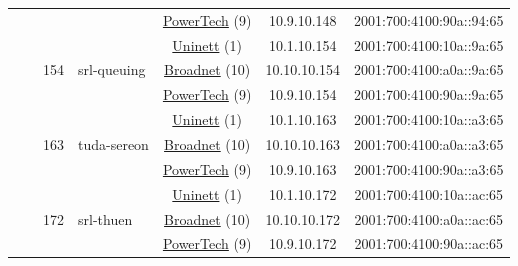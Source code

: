 \begin{small}
\begin{center}
\begin{longtable}{|c|c|c|c|c|c|c|c|}
  &  &  &  & \multicolumn{2}{|c|}{\tiny{\href{http://www.powertech.no}{PowerTech} (9)}} & \tiny{10.9.10.148} & \tiny{2001:700:4100:90a::94:65} \\* \cline{3-3}\cline{4-4}\cline{5-5}\cline{6-6}\cline{7-7}\cline{8-8}
  &  & \multirow{3}{*}{\tiny{154}} & \multicolumn{1}{|l|}{\multirow{3}{*}{\tiny{srl-queuing}}} & \multicolumn{2}{|c|}{\tiny{\href{https://www.uninett.no}{Uninett} (1)}} & \tiny{10.1.10.154} & \tiny{2001:700:4100:10a::9a:65} \\* \cline{5-5}\cline{6-6}\cline{7-7}\cline{8-8}
  &  &  &  & \multicolumn{2}{|c|}{\tiny{\href{https://www.broadnet.no}{Broadnet} (10)}} & \tiny{10.10.10.154} & \tiny{2001:700:4100:a0a::9a:65} \\* \cline{5-5}\cline{6-6}\cline{7-7}\cline{8-8}
  &  &  &  & \multicolumn{2}{|c|}{\tiny{\href{http://www.powertech.no}{PowerTech} (9)}} & \tiny{10.9.10.154} & \tiny{2001:700:4100:90a::9a:65} \\* \cline{3-3}\cline{4-4}\cline{5-5}\cline{6-6}\cline{7-7}\cline{8-8}
  &  & \multirow{3}{*}{\tiny{163}} & \multicolumn{1}{|l|}{\multirow{3}{*}{\tiny{tuda-sereon}}} & \multicolumn{2}{|c|}{\tiny{\href{https://www.uninett.no}{Uninett} (1)}} & \tiny{10.1.10.163} & \tiny{2001:700:4100:10a::a3:65} \\* \cline{5-5}\cline{6-6}\cline{7-7}\cline{8-8}
  &  &  &  & \multicolumn{2}{|c|}{\tiny{\href{https://www.broadnet.no}{Broadnet} (10)}} & \tiny{10.10.10.163} & \tiny{2001:700:4100:a0a::a3:65} \\* \cline{5-5}\cline{6-6}\cline{7-7}\cline{8-8}
  &  &  &  & \multicolumn{2}{|c|}{\tiny{\href{http://www.powertech.no}{PowerTech} (9)}} & \tiny{10.9.10.163} & \tiny{2001:700:4100:90a::a3:65} \\* \cline{3-3}\cline{4-4}\cline{5-5}\cline{6-6}\cline{7-7}\cline{8-8}
  &  & \multirow{3}{*}{\tiny{172}} & \multicolumn{1}{|l|}{\multirow{3}{*}{\tiny{srl-thuen}}} & \multicolumn{2}{|c|}{\tiny{\href{https://www.uninett.no}{Uninett} (1)}} & \tiny{10.1.10.172} & \tiny{2001:700:4100:10a::ac:65} \\* \cline{5-5}\cline{6-6}\cline{7-7}\cline{8-8}
  &  &  &  & \multicolumn{2}{|c|}{\tiny{\href{https://www.broadnet.no}{Broadnet} (10)}} & \tiny{10.10.10.172} & \tiny{2001:700:4100:a0a::ac:65} \\* \cline{5-5}\cline{6-6}\cline{7-7}\cline{8-8}
  &  &  &  & \multicolumn{2}{|c|}{\tiny{\href{http://www.powertech.no}{PowerTech} (9)}} & \tiny{10.9.10.172} & \tiny{2001:700:4100:90a::ac:65} \\* \cline{3-3}\cline{4-4}\cline{5-5}\cline{6-6}\cline{7-7}\cline{8-8}

\end{longtable}
\end{center}
\end{small}
